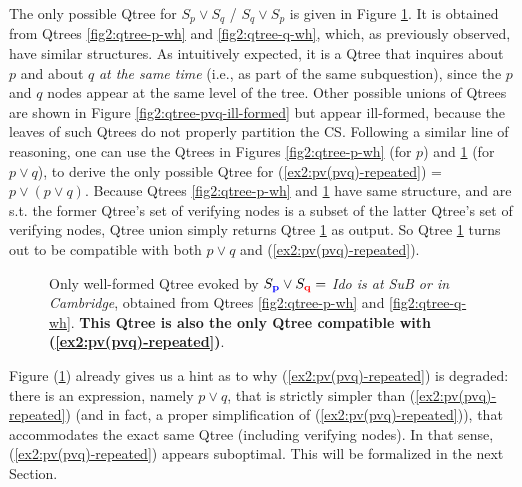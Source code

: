 The only possible Qtree for $S_p \vee S_q$ / $S_q \vee S_p$ is given in Figure \ref{fig2:qtree-pvq}. It is obtained from Qtrees \ref{fig2:qtree-p-wh} and \ref{fig2:qtree-q-wh}, which, as previously observed, have similar structures. As intuitively expected, it is a Qtree that inquires about $p$ and about $q$ \textit{at the same time} (i.e., as part of the same subquestion), since the $p$ and $q$ nodes appear at the same level of the tree. Other possible unions of Qtrees are shown in Figure \ref{fig2:qtree-pvq-ill-formed} but appear ill-formed, because the leaves of such Qtrees do not properly partition the CS. Following a similar line of reasoning, one can use the Qtrees in Figures \ref{fig2:qtree-p-wh} (for $p$) and \ref{fig2:qtree-pvq} (for $p\vee q$), to derive the only possible Qtree for (\ref{ex2:pv(pvq)-repeated}) = $p\vee(p\vee q)$. Because Qtrees \ref{fig2:qtree-p-wh} and  \ref{fig2:qtree-pvq} have same structure, and are s.t. the former Qtree's set of verifying nodes is a subset of the latter Qtree's set of verifying nodes, Qtree union simply returns Qtree \ref{fig2:qtree-pvq} as output. So Qtree \ref{fig2:qtree-pvq} turns out to be compatible with both $p \vee q$ and (\ref{ex2:pv(pvq)-repeated}).

\begin{figure}[H]
	\centering
	\scalebox{1}{
		\begin{forest}
			[CS [\fbox{$\p$}] [\fbox{$\q$}] [\r] [...]]
		\end{forest}
	}
	\caption{Only well-formed Qtree evoked by $S\protect_{\textbf{\textcolor{blue}{p}}} \vee S\protect_{\textbf{\textcolor{red}{q}}} =$ \textit{Ido is at SuB or in Cambridge}, obtained from Qtrees \ref{fig2:qtree-p-wh} and \ref{fig2:qtree-q-wh}. \textbf{This Qtree is also the only Qtree compatible with (\ref{ex2:pv(pvq)-repeated})}.}\label{fig2:qtree-pvq}
\end{figure}

Figure (\ref{fig2:qtree-pvq}) already gives us a hint as to why (\ref{ex2:pv(pvq)-repeated}) is degraded: there is an expression, namely $p \vee q$, that is strictly simpler than (\ref{ex2:pv(pvq)-repeated}) (and in fact, a proper simplification of (\ref{ex2:pv(pvq)-repeated})), that accommodates the exact same Qtree (including verifying nodes). In that sense, (\ref{ex2:pv(pvq)-repeated}) appears suboptimal. This will be formalized in the next Section.


